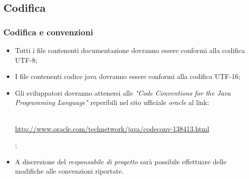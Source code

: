 \subsection{Codifica}
\subsubsection{Codifica e convenzioni}
\begin{itemize}

\item Tutti i file contenenti documentazione dovranno essere conformi alla codifica UTF-8;

\item I file contenenti codice java  dovranno essere conformi alla codifica UTF-16;

\item Gli sviluppatori dovranno attenersi alle \textit{"Code Conventions for the Java Programming Language"} reperibili nel sito ufficiale \textit{oracle} al link:\\ \\
\centerline{ \url{http://www.oracle.com/technetwork/java/codeconv-138413.html}};

\item A discrezione del \textit{responsabile di progetto} sarà possibile effettuare delle modifiche alle convenzioni riportate.
\end{itemize}
